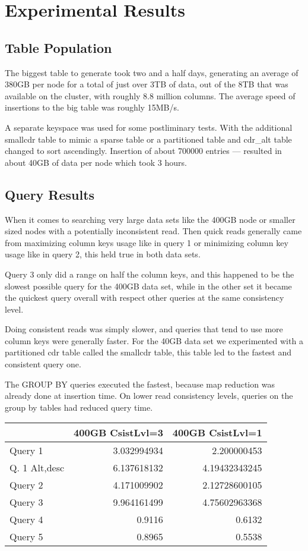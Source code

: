 \documentclass[letterpaper]{article}
\begin{document}
\section{Experimental Results}

\subsection{Table Population}

The biggest table to generate took two and a half days, generating an average
of 380GB per node for a total of just over 3TB of data, out of the 8TB that was
available on the cluster, with roughly 8.8 million columns. 
The average speed of insertions to the big table was roughly 15MB/s.

A separate keyspace was used for some postliminary tests. With the additional smallcdr table
to mimic a sparse table or a partitioned table and cdr\_alt table changed to sort ascendingly. 
Insertion of about 700000 entries --- resulted in about 40GB of data per node which took 3 hours.

\subsection{Query Results}
When it comes to searching very large data sets like the 400GB node or smaller sized nodes with a 
potentially inconsistent read. Then quick reads generally came from maximizing column keys usage
like in query 1 or minimizing column key usage like in query 2, this held true in both data sets. 

Query 3 only did a range on half the column keys, and this 
happened to be the slowest possible query for the 400GB data set, while in the other set
it became the quickest query overall with respect other queries at the same consistency level. 

Doing consistent reads was simply slower, and queries that tend to use more column keys were 
generally faster.
For the 40GB data set we experimented with a partitioned cdr table called the smallcdr table, this
table led to the fastest and consistent query one.

The GROUP BY queries executed the
fastest, because map reduction was already done at insertion time. 
On lower read consistency levels, queries on the group by tables had reduced query time.
\\

\begin{tabular}[h]{|l|r|r|}
\hline
& 400GB CsistLvl=3 & 400GB CsistLvl=1 \\ \hline
Query 1       & 3.032994934 & 2.200000453 \\
Q. 1 Alt,desc   & 6.137618132 & 4.19432343245 \\
Query 2       & 4.171009902 & 2.12728600105 \\
Query 3       & 9.964161499 & 4.75602963368 \\
Query 4       & 0.9116 & 0.6132 \\
Query 5       & 0.8965 & 0.5538 \\\hline
\end{tabular}
\end{document}
